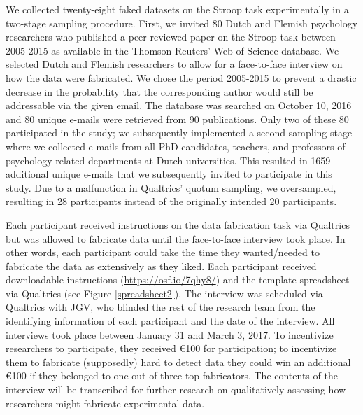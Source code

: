 \documentclass{article}
\begin{document}
We collected twenty-eight faked datasets on the Stroop task experimentally in a two-stage sampling procedure. First, we invited 80 Dutch and Flemish psychology researchers who published a peer-reviewed paper on the Stroop task between 2005-2015 as available in the Thomson Reuters’ Web of Science database. We selected Dutch and Flemish researchers to allow for a face-to-face interview on how the data were fabricated. We chose the period 2005-2015 to prevent a drastic decrease in the probability that the corresponding author would still be addressable via the given email. The database was searched on October 10, 2016 and 80 unique e-mails were retrieved from 90 publications. Only two of these 80 participated in the study; we subsequently implemented a second sampling stage where we collected e-mails from all PhD-candidates, teachers, and professors of psychology related departments at Dutch universities. This resulted in 1659 additional unique e-mails that we subsequently invited to participate in this study. Due to a malfunction in Qualtrics' quotum sampling, we oversampled, resulting in 28 participants instead of the originally intended 20 participants.

Each participant received instructions on the data fabrication task via Qualtrics but was allowed to fabricate data until the face-to-face interview took place. In other words, each participant could take the time they wanted/needed to fabricate the data as extensively as they liked. Each participant received downloadable instructions (\url{https://osf.io/7qhy8/}) and the template spreadsheet via Qualtrics (see Figure \ref{spreadsheet2}). The interview was scheduled via Qualtrics with JGV, who blinded the rest of the research team from the identifying information of each participant and the date of the interview. All interviews took place between January 31 and March 3, 2017. To incentivize researchers to participate, they received \euro 100 for participation; to incentivize them to fabricate (supposedly) hard to detect data they could win an additional \euro 100 if they belonged to one out of three top fabricators. The contents of the interview will be transcribed for further research on qualitatively assessing how researchers might fabricate experimental data.
\end{document}
